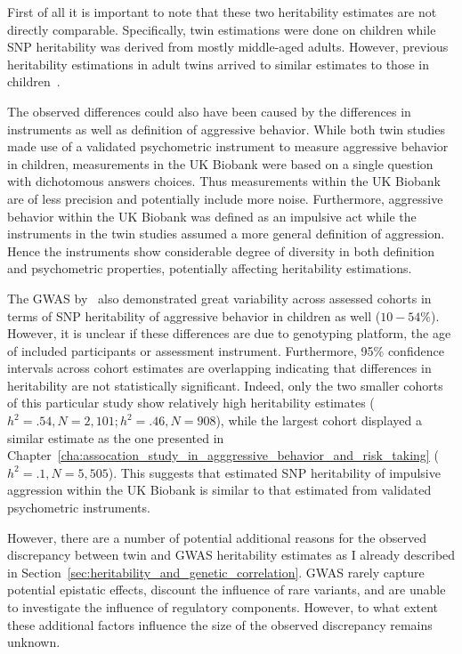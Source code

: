 First of all it is important to note that these two heritability estimates are not directly comparable.
Specifically, twin estimations were done on children while SNP heritability was derived from mostly middle-aged adults.
However, previous heritability estimations in adult twins arrived to similar estimates to those in children~\cite{Miles1997a}.

The observed differences could also have been caused by the differences in  instruments as well as definition of aggressive behavior.
While both  twin studies made use of a validated psychometric instrument to measure aggressive behavior in children, measurements in the UK Biobank were based on a single question with dichotomous answers choices.
Thus measurements within the UK Biobank are of less precision and potentially include more noise.
Furthermore, aggressive behavior within the UK Biobank was defined as an impulsive act while the  instruments in the twin studies assumed a more general definition of aggression.
Hence the  instruments show considerable degree of diversity in both definition and psychometric properties, potentially affecting heritability estimations.

The GWAS by~\citet{Pappa2016a} also demonstrated great variability across assessed cohorts in terms of SNP heritability of aggressive behavior in children as well ($10-54\%$).
However, it is unclear if these differences are due to genotyping platform, the age of included participants or assessment instrument.
Furthermore, 95\% confidence intervals across cohort estimates are overlapping indicating that differences in heritability are not statistically significant.
Indeed, only the two smaller cohorts of this particular study show relatively high heritability estimates ($h^2=.54, N=2,101; h^2=.46, N=908$), while the largest cohort displayed a similar estimate as the one presented in Chapter~\ref{cha:assocation_study_in_agggressive_behavior_and_risk_taking} ($h^2=.1, N=5,505$).
This suggests that estimated SNP heritability of impulsive aggression within the UK Biobank is similar to that estimated from validated psychometric instruments. 

However, there are a number of potential additional reasons for the observed discrepancy between twin and GWAS heritability estimates as I already described in Section~\ref{sec:heritability_and_genetic_correlation}.
GWAS rarely capture potential epistatic effects, discount the influence of rare variants, and are unable to investigate the influence of regulatory components. 
However, to what extent these additional factors influence the size of the observed discrepancy remains unknown.

